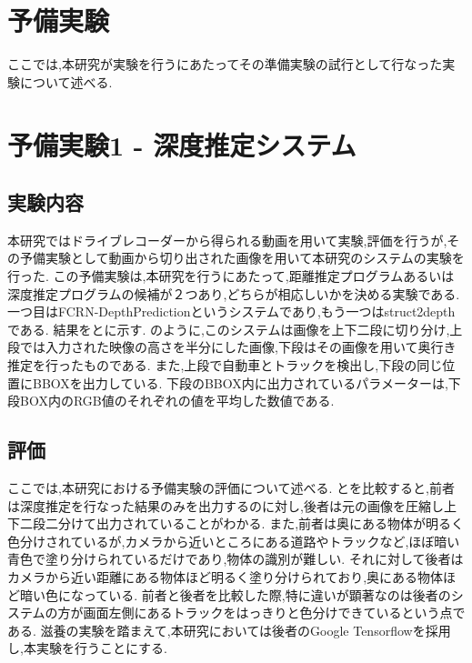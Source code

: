 \section{予備実験}
ここでは,本研究が実験を行うにあたってその準備実験の試行として行なった実験について述べる.
\section{予備実験1 - 深度推定システム}
\subsection{実験内容}
本研究ではドライブレコーダーから得られる動画を用いて実験,評価を行うが,その予備実験として動画から切り出された画像を用いて本研究のシステムの実験を行った.
この予備実験は,本研究を行うにあたって,距離推定プログラムあるいは深度推定プログラムの候補が２つあり,どちらが相応しいかを決める実験である.
一つ目はFCRN-DepthPrediction\cite{laina2016deeper}というシステムであり,もう一つはstruct2depthである.
結果をとに示す.
のように,このシステムは画像を上下二段に切り分け,上段では入力された映像の高さを半分にした画像,下段はその画像を用いて奥行き推定を行ったものである.
また,上段で自動車とトラックを検出し,下段の同じ位置にBBOXを出力している.
下段のBBOX内に出力されているパラメーターは,下段BOX内のRGB値のそれぞれの値を平均した数値である.

\subsection{評価}
ここでは,本研究における予備実験の評価について述べる.
とを比較すると,前者は深度推定を行なった結果のみを出力するのに対し,後者は元の画像を圧縮し上下二段二分けて出力されていることがわかる.
また,前者は奥にある物体が明るく色分けされているが,カメラから近いところにある道路やトラックなど,ほぼ暗い青色で塗り分けられているだけであり,物体の識別が難しい.
それに対して後者はカメラから近い距離にある物体ほど明るく塗り分けられており,奥にある物体ほど暗い色になっている.
前者と後者を比較した際,特に違いが顕著なのは後者のシステムの方が画面左側にあるトラックをはっきりと色分けできているという点である.
滋養の実験を踏まえて,本研究においては後者のGoogle Tensorflowを採用し,本実験を行うことにする.

